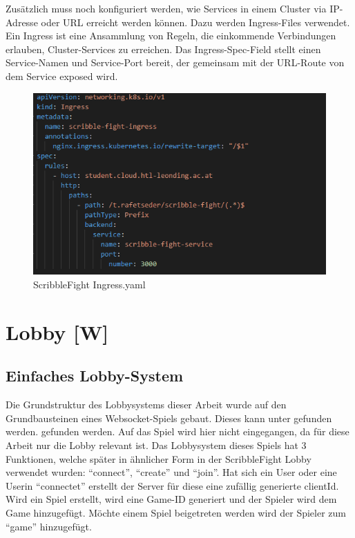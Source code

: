 Zusätzlich muss noch konfiguriert werden, wie Services in einem Cluster via IP-Adresse oder URL erreicht werden können.
Dazu werden Ingress-Files verwendet. Ein Ingress ist eine Ansammlung von Regeln, die einkommende Verbindungen erlauben, Cluster-Services zu erreichen.
Das Ingress-Spec-Field stellt einen Service-Namen und Service-Port bereit, der gemeinsam mit der URL-Route von dem Service exposed wird.

\begin{figure}[H]
    \centering
    \includegraphics[scale=0.85]{pics/ingress.PNG}
    \caption{ScribbleFight Ingress.yaml}
\end{figure}





\section{Lobby [W]}
\subsection{Einfaches Lobby-System}
Die Grundstruktur des Lobbysystems dieser Arbeit wurde auf den
Grundbausteinen eines Websocket-Spiels gebaut.
Dieses kann unter \cite{gameLobby} 
gefunden werden.
gefunden werden. Auf das Spiel wird hier nicht eingegangen, da für
diese Arbeit nur die Lobby relevant ist. Das Lobbysystem dieses Spiels hat 3 Funktionen, welche später in ähnlicher Form in der ScribbleFight Lobby verwendet wurden: ``connect'', ``create'' und ``join''.
Hat sich ein User oder eine Userin ``connectet'' erstellt der Server für diese eine zufällig generierte clientId.
Wird ein Spiel erstellt, wird eine Game-ID generiert und der Spieler wird dem Game hinzugefügt.
Möchte einem Spiel beigetreten werden wird der Spieler zum ``game'' hinzugefügt.

